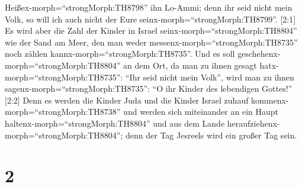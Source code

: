 Heißex-morph=``strongMorph:TH8798'' ihn Lo-Ammi; denn ihr seid nicht
mein Volk, so will ich auch nicht der Eure
seinx-morph=``strongMorph:TH8799''.  {[}2:1{]} Es wird aber
die Zahl der Kinder in Israel seinx-morph=``strongMorph:TH8804'' wie der
Sand am Meer, den man weder messenx-morph=``strongMorph:TH8735'' noch
zählen kannx-morph=``strongMorph:TH8735''. Und es soll
geschehenx-morph=``strongMorph:TH8804'' an dem Ort, da man zu ihnen
gesagt hatx-morph=``strongMorph:TH8735'': ``Ihr seid nicht mein Volk'',
wird man zu ihnen sagenx-morph=``strongMorph:TH8735'': ``O ihr Kinder
des lebendigen Gottes!''  {[}2:2{]} Denn es werden die
Kinder Juda und die Kinder Israel zuhauf
kommenx-morph=``strongMorph:TH8738'' und werden sich miteinander an ein
Haupt haltenx-morph=``strongMorph:TH8804'' und aus dem Lande
heraufziehenx-morph=``strongMorph:TH8804''; denn der Tag Jesreels wird
ein großer Tag sein.

\hypertarget{section-1}{%
\section{2}\label{section-1}}

